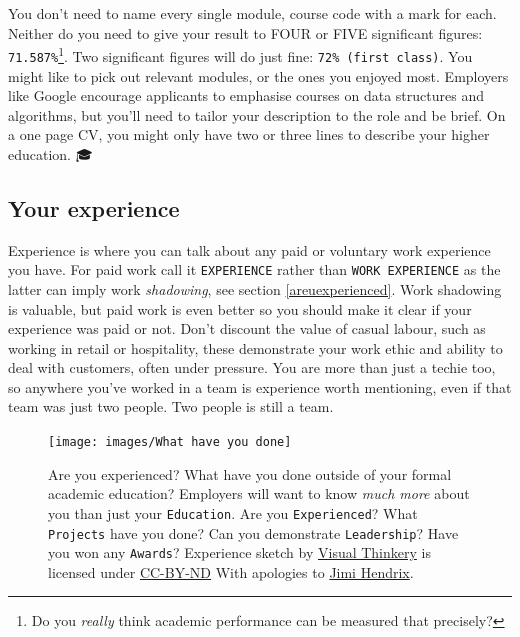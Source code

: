 \documentclass[
]{book}
\begin{document}
You don't need to name every single module, course code with a mark for each. Neither do you need to give your result to FOUR or FIVE significant figures: \texttt{71.587\%}\footnote{Do you \emph{really} think academic performance can be measured that precisely?}. Two significant figures will do just fine: \texttt{72\%\ (first\ class)}. You might like to pick out relevant modules, or the ones you enjoyed most. Employers like Google encourage applicants to emphasise courses on data structures and algorithms, but you'll need to tailor your description to the role and be brief. On a one page CV, you might only have two or three lines to describe your higher education. 🎓

\hypertarget{mycvex}{%
\subsection{Your experience}\label{mycvex}}

Experience is where you can talk about any paid or voluntary work experience you have. For paid work call it \texttt{EXPERIENCE} rather than \texttt{WORK\ EXPERIENCE} as the latter can imply work \emph{shadowing}, see section \ref{areuexperienced}. Work shadowing is valuable, but paid work is even better so you should make it clear if your experience was paid or not. Don't discount the value of casual labour, such as working in retail or hospitality, these demonstrate your work ethic and ability to deal with customers, often under pressure. You are more than just a techie too, so anywhere you've worked in a team is experience worth mentioning, even if that team was just two people. Two people is still a team.

\begin{figure}

{\centering \texttt{[image: images/What have you done]} 

}

\caption{Are you experienced? What have you done outside of your formal academic education? Employers will want to know \emph{much more} about you than just your \texttt{Education}. Are you \texttt{Experienced}? What \texttt{Projects} have you done? Can you demonstrate \texttt{Leadership}? Have you won any \texttt{Awards}? Experience sketch by \href{https://visualthinkery.com/}{Visual Thinkery} is licensed under \href{https://creativecommons.org/licenses/by-nd/4.0/}{CC-BY-ND} With apologies to \href{https://en.wikipedia.org/wiki/Jimi_Hendrix}{Jimi Hendrix}. \citep{hendrix}}\label{fig:done-fig}
\end{figure}
\end{document}

